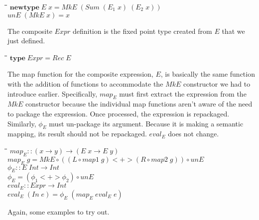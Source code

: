 \documentclass[10pt]{article}
\newlength{\lwidth}\setlength{\lwidth}{4.5cm}
\newlength{\cwidth}\setlength{\cwidth}{8mm} %
\newcommand{\Conid}[1]{\mathit{#1}}
\newcommand{\Varid}[1]{\mathit{#1}}
\begin{document}
\begin{tabbing}
\qquad\=\hspace{\lwidth}\=\hspace{\cwidth}\=\+\kill
${\mathbf{newtype}\;\Conid{E}\;\Varid{x}\mathrel{=}\Conid{MkE}\;(\Conid{Sum}\;(\Varid{E}_1\;\Varid{x})\;(\Varid{E}_2\;\Varid{x}))}$\\
${}$\\
${\Varid{unE}\;(\Conid{MkE}\;\Varid{x})\mathrel{=}\Varid{x}}$
\end{tabbing}
The composite \ensuremath{\Conid{Expr}} definition is the fixed point type created from
\ensuremath{\Conid{E}} that we just defined.

\begin{tabbing}
\qquad\=\hspace{\lwidth}\=\hspace{\cwidth}\=\+\kill
${\mathbf{type}\;\Conid{Expr}\mathrel{=}\Conid{Rec}\;\Conid{E}}$
\end{tabbing}
The map function for the composite expression, \ensuremath{\Conid{E}}, is basically the
same function with the addition of functions to accommodate the \ensuremath{\Conid{MkE}}
constructor we had to introduce earlier. Specifically, \ensuremath{\Varid{map}_E} must
first extract the expression from the \ensuremath{\Conid{MkE}} constructor because the
individual map functions aren't aware of the need to package the
expression.  Once processed, the expression is repackaged.  Similarly,
\ensuremath{\Varid{\phi}_E} must un-package its argument.  Because it is making a semantic
mapping, its result should not be repackaged.  \ensuremath{\Varid{eval}_E} does not
change.

\begin{tabbing}
\qquad\=\hspace{\lwidth}\=\hspace{\cwidth}\=\+\kill
${\Varid{map}_E\mathbin{::}(\Varid{x}\to \Varid{y})\to (\Conid{E}\;\Varid{x}\to \Conid{E}\;\Varid{y})}$\\
${\Varid{map}_E\;\Varid{g}\mathrel{=}\Conid{MkE}\mathbin{\circ}((\Conid{L}\mathbin{\circ}\Varid{map1}\;\Varid{g})\mathbin{<+>}(\Conid{R}\mathbin{\circ}\Varid{map2}\;\Varid{g}))\mathbin{\circ}\Varid{unE}}$\\
${}$\\
${\Varid{\phi}_E\mathbin{::}\Conid{E}\;\Conid{Int}\to \Conid{Int}}$\\
${\Varid{\phi}_E\mathrel{=}(\Varid{\phi_1}\mathbin{<+>}\Varid{\phi_2})\mathbin{\circ}\Varid{unE}}$\\
${}$\\
${\Varid{eval}_E\mathbin{::}\Conid{Expr}\to \Conid{Int}}$\\
${\Varid{eval}_E\;(\Conid{In}\;\Varid{e})\mathrel{=}\Varid{\phi}_E\;(\Varid{map}_E\;\Varid{eval}_E\;\Varid{e})}$
\end{tabbing}
Again, some examples to try out.
\end{document}
